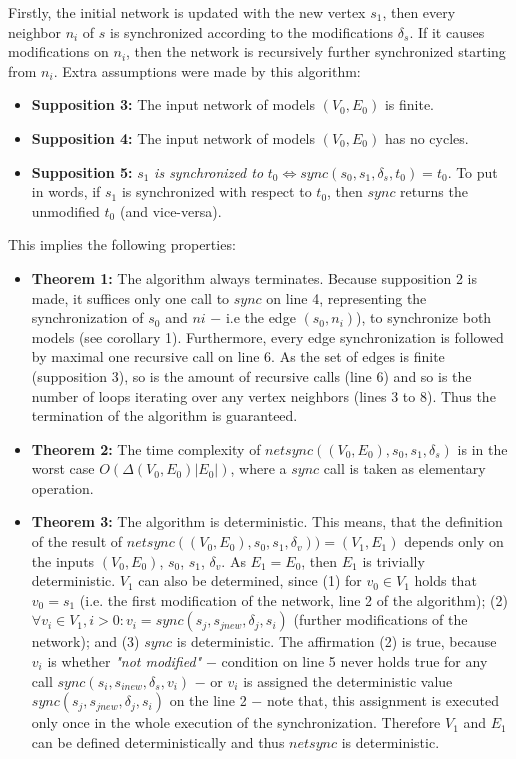\documentclass[tuberlin,cic,tc,english,noabntcite, oneside]{iiufrgs}
\begin{document}
Firstly, the initial network is updated with the new vertex $s_1$, then every neighbor $n_i$ of $s$ is synchronized according to the modifications $\delta_s$. If it causes modifications on $n_i$, then the network is recursively further synchronized starting from $n_i$. Extra assumptions were made by this algorithm:

\begin{itemize}
\item \textbf{Supposition 3:} The input network of models $(V_0,E_0)$ is finite.

\item \textbf{Supposition 4:} The input network of models $(V_0,E_0)$ has no cycles.

\item \textbf{Supposition 5:} $s_1$  \emph{is synchronized to}  $t_0 \Leftrightarrow sync(s_0, s_1, \delta_s, t_0) = t_0 $. To put in words, if $s_1$ is synchronized with respect to $t_0$, then $sync$ returns the unmodified $t_0$ (and vice-versa).
\end{itemize}

This implies the following properties:

\begin{itemize}
\item \textbf{Theorem 1:} The algorithm always terminates. Because supposition 2 is made, it suffices only one call to $sync$ on line 4, representing the synchronization of $s_0$ and $ni$ $-$ i.e the edge $(s_0,n_i)$), to synchronize both models (see corollary 1). Furthermore, every edge synchronization is followed by maximal one recursive call on line 6. As the set of edges is finite (supposition 3), so is the amount of recursive calls (line 6) and so is the number of loops iterating over any vertex neighbors (lines 3 to 8). Thus the termination of the algorithm is guaranteed.

\item \textbf{Theorem 2:} The time complexity of $netsync((V_0,E_0), s_0, s_1, \delta_s)$ is in the worst case $O(\Delta(V_0,E_0) |E_0|)$, where a $sync$ call is taken as elementary operation.

\item \textbf{Theorem 3:} The algorithm is deterministic. This means, that the definition of the result of $netsync((V_0,E_0), s_0, s_1, \delta_v)) = (V_1,E_1)$ depends only on the inputs $(V_0,E_0)$, $s_0$, $s_1$, $\delta_v$. As $E_1 = E_0$, then $E_1$ is trivially deterministic. $V_1$ can also be determined, since (1) for $v_0 \in V_1$ holds that $v_0 = s_1$ (i.e. the first modification of the network, line 2 of the algorithm); (2) $\forall v_i \in V_1, i > 0: v_i = sync(s_j, s_{jnew}, \delta_j, s_i)$ (further modifications of the network); and (3) $sync$ is deterministic. The affirmation (2) is true, because $v_i$ is whether \emph{"not modified"} $-$ condition on line 5 never holds true for any call $sync(s_i, s_{inew}, \delta_s, v_i)$ $-$ or $v_i$ is assigned the deterministic value $sync(s_j, s_{jnew}, \delta_j, s_i)$ on the line 2 $-$ note that, this assignment is executed only once in the whole execution of the synchronization. Therefore $V_1$ and $E_1$ can be defined deterministically and thus $netsync$ is deterministic.
\end{itemize} 
\end{document}
